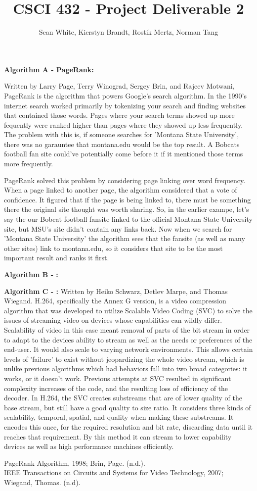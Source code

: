 \documentclass[12pt]{article}
\author{Sean White, Kierstyn Brandt, Rostik Mertz, Norman Tang}
\title{CSCI 432 - Project Deliverable 2}
\begin{document}
\maketitle

\noindent
\textbf{Algorithm A - PageRank:}\smallskip

Written by Larry Page, Terry Winograd, Sergey Brin, and Rajeev Motwani, PageRank is the algorithm that powers Google's search algorithm. In the 1990's internet search worked primarily by tokenizing your search and finding websites that contained those words. Pages where your search terms showed up more fequently were ranked higher than pages where they showed up less frequently. The problem with this is, if someone searches for 'Montana State University', there was no garauntee that montana.edu would be the top result. A Bobcats football fan site could've potentially come before it if it mentioned those terms more frequently.

PageRank solved this problem by considering page linking over word frequency. When a page linked to another page, the algorithm considered that a vote of confidence. It figured that if the page is being linked to, there must be something there the original site thought was worth sharing. So, in the earlier exampe, let's say the our Bobcat football fansite linked to the official Montana State University site, but MSU's site didn't contain any links back. Now when we search for 'Montana State University' the algorithm sees that the fansite (as well as many other sites) link to montana.edu, so it considers that site to be the most important result and ranks it first.
\bigskip

\noindent
\textbf{Algorithm B - :}\smallskip

\bigskip
\noindent
\textbf{Algorithm C - :}\smallskip
Written by Heiko Schwarz, Detlev Marpe, and Thomas Wiegand. H.264, specifically the Annex G version, is a video compression algorithm that was developed to utilize Scalable Video Coding (SVC) to solve the issues of streaming video on devices whose capabilities can wildly differ. Scalability of video in this case meant removal of parts of the bit stream in order to adapt to the devices ability to stream as well as the needs or preferences of the end-user. It would also scale to varying network environments. This allows certain levels of 'failure' to exist without jeopardizing the whole video stream, which is unlike previous algorithms which had behaviors fall into two broad categories: it works, or it doesn't work. \newline
Previous attempts at SVC resulted in significant complexity increases of the code, and the resulting loss of efficiency of the decoder. In H.264, the SVC creates substreams that are of lower quality of the base stream, but still have a good quality to size ratio. It considers three kinds of scalability, temporal, spatial, and quality when making these substreams. It encodes this once, for the required resolution and bit rate, discarding data until it reaches that requirement. By this method it can stream to lower capability devices as well as high performance machines efficiently.
\bigskip

PageRank Algorithm, 1998; Brin, Page. (n.d.). \\
IEEE Transactions on Circuits and Systems for Video Technology, 2007; Wiegand, Thomas. (n.d).
\end{document}
